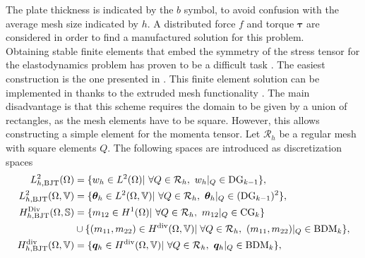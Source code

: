 The plate thickness is indicated by the $b$ symbol, to avoid confusion with the average mesh size indicated by $h$. A distributed force $f$ and torque $\bm{\tau}$ are considered in order to find a manufactured solution for this problem. \\

Obtaining stable finite elements that embed the symmetry of the stress tensor for the elastodynamics problem has proven to be a difficult task \cite{arnold2002mixed}. The easiest construction is the one presented in \cite{becache2001elas}. This finite element solution can be implemented in {} \cite{rathgeber2017firedrake} thanks to the extruded mesh functionality \cite{mcrae2016}.  The main disadvantage is that this scheme requires the domain to be given by a union of rectangles, as the mesh elements have to be square. However, this allows constructing a simple element for the momenta tensor. Let $\mathcal{R}_h$ be a regular mesh with square elements $Q$. The following spaces are introduced as discretization spaces
\begin{equation}
\label{eq:BTJ}
\begin{aligned}
L_{h, \text{BJT}}^2(\Omega) &= \{w_h \in L^2(\Omega) | \ \forall Q \in \mathcal{R}_h, \ w_h|_{Q} \in \mathrm{DG}_{k-1} \}, \\
L_{h, \text{BJT}}^2(\Omega, \mathbb{V}) &= \{\bm{\theta}_h \in L^2(\Omega, \mathbb{V}) | \ \forall Q \in \mathcal{R}_h,\ \bm{\theta}_h|_{Q} \in (\mathrm{DG}_{k-1})^2 \}, \\
H_{h, \text{BJT}}^{\Div}(\Omega, \mathbb{S}) &= \{m_{12} \in H^1(\Omega)| \ \forall Q \in \mathcal{R}_h,\ m_{12}|_{Q} \in \mathrm{CG}_{k} \}  \\
&\cup \{(m_{11}, m_{22}) \in H^{\div}(\Omega, \mathbb{V})| \; \forall Q\in \mathcal{R}_h,\ (m_{11}, m_{22})|_{Q} \in \mathrm{BDM}_{k} \}, \\
H_{h, \text{BJT}}^{\div}(\Omega, \mathbb{V}) &= \{\bm{q}_h \in H^{\div}(\Omega, \mathbb{V}) | \ \forall Q\in \mathcal{R}_h,\ \bm{q}_h|_{Q} \in \mathrm{BDM}_{k} \}, \\ 
\end{aligned}
\end{equation}

